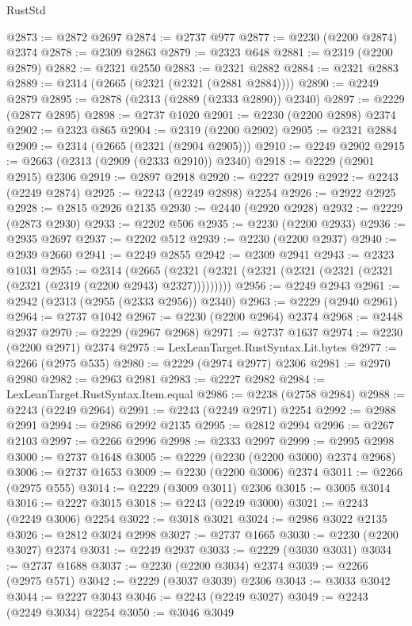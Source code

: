 \begin{lexlean}{RustStd}
\begin{coremodule}
{\begin{coremodule}
{{{{{{{{{{{{{{{{{{{{{{{{{{{{{{{{{{@2873 := @2872 @2697
@2874 := @2737 @977
@2877 := @2230 (@2200 @2874) @2374
@2878 := @2309 @2863
@2879 := @2323 @648
@2881 := @2319 (@2200 @2879)
@2882 := @2321 @2550
@2883 := @2321 @2882
@2884 := @2321 @2883
@2889 := @2314 (@2665 (@2321 (@2321 (@2881 @2884))))
@2890 := @2249 @2879
@2895 := @2878 (@2313 (@2889 (@2333 @2890)) @2340)
@2897 := @2229 (@2877 @2895)
@2898 := @2737 @1020
@2901 := @2230 (@2200 @2898) @2374
@2902 := @2323 @865
@2904 := @2319 (@2200 @2902)
@2905 := @2321 @2884
@2909 := @2314 (@2665 (@2321 (@2904 @2905)))
@2910 := @2249 @2902
@2915 := @2663 (@2313 (@2909 (@2333 @2910)) @2340)
@2918 := @2229 (@2901 @2915) @2306
@2919 := @2897 @2918
@2920 := @2227 @2919
@2922 := @2243 (@2249 @2874)
@2925 := @2243 (@2249 @2898) @2254
@2926 := @2922 @2925
@2928 := @2815 @2926 @2135
@2930 := @2440 (@2920 @2928)
@2932 := @2229 (@2873 @2930)
@2933 := @2202 @506
@2935 := @2230 (@2200 @2933)
@2936 := @2935 @2697
@2937 := @2202 @512
@2939 := @2230 (@2200 @2937)
@2940 := @2939 @2660
@2941 := @2249 @2855
@2942 := @2309 @2941
@2943 := @2323 @1031
@2955 := @2314
    (@2665 (@2321 (@2321 (@2321 (@2321 (@2321 (@2321 (@2321 (@2319 (@2200 @2943) @2327)))))))))
@2956 := @2249 @2943
@2961 := @2942 (@2313 (@2955 (@2333 @2956)) @2340)
@2963 := @2229 (@2940 @2961)
@2964 := @2737 @1042
@2967 := @2230 (@2200 @2964) @2374
@2968 := @2448 @2937
@2970 := @2229 (@2967 @2968)
@2971 := @2737 @1637
@2974 := @2230 (@2200 @2971) @2374
@2975 := LexLeanTarget.RustSyntax.Lit.bytes
@2977 := @2266 (@2975 @535)
@2980 := @2229 (@2974 @2977) @2306
@2981 := @2970 @2980
@2982 := @2963 @2981
@2983 := @2227 @2982
@2984 := LexLeanTarget.RustSyntax.Item.equal
@2986 := @2238 (@2758 @2984)
@2988 := @2243 (@2249 @2964)
@2991 := @2243 (@2249 @2971) @2254
@2992 := @2988 @2991
@2994 := @2986 @2992 @2135
@2995 := @2812 @2994
@2996 := @2267 @2103
@2997 := @2266 @2996
@2998 := @2333 @2997
@2999 := @2995 @2998
@3000 := @2737 @1648
@3005 := @2229 (@2230 (@2200 @3000) @2374 @2968)
@3006 := @2737 @1653
@3009 := @2230 (@2200 @3006) @2374
@3011 := @2266 (@2975 @555)
@3014 := @2229 (@3009 @3011) @2306
@3015 := @3005 @3014
@3016 := @2227 @3015
@3018 := @2243 (@2249 @3000)
@3021 := @2243 (@2249 @3006) @2254
@3022 := @3018 @3021
@3024 := @2986 @3022 @2135
@3026 := @2812 @3024 @2998
@3027 := @2737 @1665
@3030 := @2230 (@2200 @3027) @2374
@3031 := @2249 @2937
@3033 := @2229 (@3030 @3031)
@3034 := @2737 @1688
@3037 := @2230 (@2200 @3034) @2374
@3039 := @2266 (@2975 @571)
@3042 := @2229 (@3037 @3039) @2306
@3043 := @3033 @3042
@3044 := @2227 @3043
@3046 := @2243 (@2249 @3027)
@3049 := @2243 (@2249 @3034) @2254
@3050 := @3046 @3049
}}}}}}}}}}}}}}}}}}}}}}}}}}}}}}}}}}
\end{coremodule}}
\end{coremodule}
\end{lexlean}
